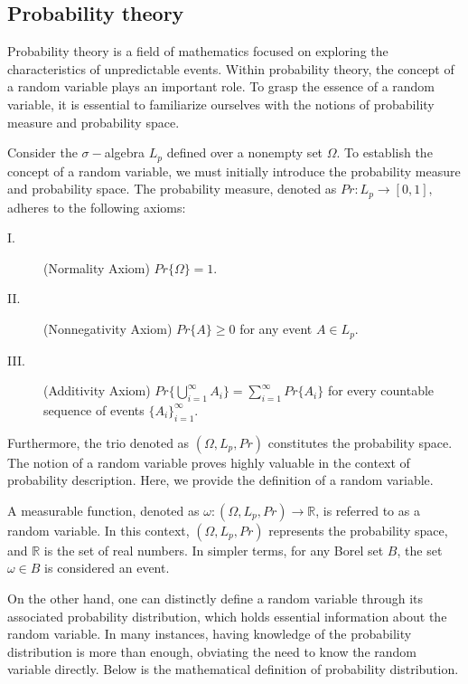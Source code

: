 \subsection{Probability theory}
Probability theory is a field of mathematics focused on exploring the characteristics of unpredictable events. Within probability theory, the concept of a random variable plays an important role. To grasp the essence of a random variable, it is essential to familiarize ourselves with the notions of probability measure and probability space.
\begin{definition}\cite{Liu 2004}\label{def.1}
	Consider the $\sigma-$algebra $L_p$ defined over a nonempty set $\Omega$. To establish the concept of a random variable, we must initially introduce the probability measure and probability space. The probability measure, denoted as $Pr:L_p\rightarrow[0,1],$ adheres to the following axioms:
	\begin{description}
		\item[I.] (Normality Axiom) $Pr\{\Omega\}=1$.
		\item[II.] (Nonnegativity Axiom) $Pr\{A\}\ge 0$ for any event $A\in L_p$.
		\item[III.] (Additivity Axiom) $Pr\big\{ \bigcup\limits_{i=1}^{\infty}A_i \big\} = \sum\limits_{i=1}^{\infty}Pr\{A_i\}$ for every countable sequence of events $\{A_i\}_{i=1}^{\infty}$.
	\end{description}
\end{definition}
	\par Furthermore, the trio denoted as $(\Omega,L_p,Pr)$ constitutes the probability space. The notion of a random variable proves highly valuable in the context of probability description. Here, we provide the definition of a random variable.
	\begin{definition}\cite{Liu 2004}\label{def.2}
		A measurable function, denoted as $\omega:(\Omega,L_p,Pr)\to \mathbb{R}$, is referred to as a random variable. In this context, $(\Omega,L_p,Pr)$ represents the probability space, and $\mathbb{R}$ is the set of real numbers. In simpler terms, for any Borel set $B$, the set ${\omega\in B}$ is considered an event.
	\end{definition}
	\par On the other hand, one can distinctly define a random variable through its associated probability distribution, which holds essential information about the random variable. In many instances, having knowledge of the probability distribution is more than enough, obviating the need to know the random variable directly. Below is the mathematical definition of probability distribution.
